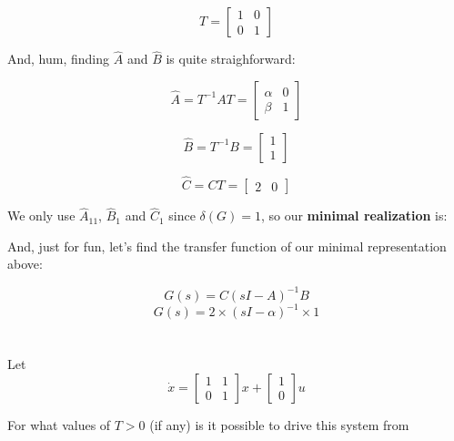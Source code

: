 \documentclass[10pt,a4paper]{article}
\begin{document}
\[
T = 
\begin{bmatrix}
1 & 0\\ 
0 & 1
\end{bmatrix}  
\]

And, hum, finding $\hat{A}$ and $\hat{B}$ is quite straighforward:

\[ \hat{A} = T^{-1}AT =
\begin{bmatrix}
\alpha & 0 \\
\beta & 1
\end{bmatrix}
\]

\[ \hat{B} = T^{-1}B =
\begin{bmatrix}
1 \\
1
\end{bmatrix}
\]

\[ \hat{C} = CT =
\begin{bmatrix}
2 & 0
\end{bmatrix}
\]

We only use $\hat{A}_{11}$, $\hat{B}_{1}$ and $\hat{C}_{1}$ since $\delta(G) = 1$, so our \textbf{minimal realization} is:

\begin{center}
\end{center}

And, just for fun, let's find the transfer function of our minimal representation above:

\[ G(s) = C(sI - A)^{-1}B \]
\[ G(s) = 2\times (sI - \alpha)^{-1}\times 1 \]
\begin{center}
\end{center}

\section{}
Let
\[
\dot{x} =
\begin{bmatrix}
1 & 1 \\
0 & 1
\end{bmatrix}
x + 
\begin{bmatrix}
1 \\
0
\end{bmatrix}
u
\]

For what values of $T>0$ (if any) is it possible to drive this system from
\end{document}
